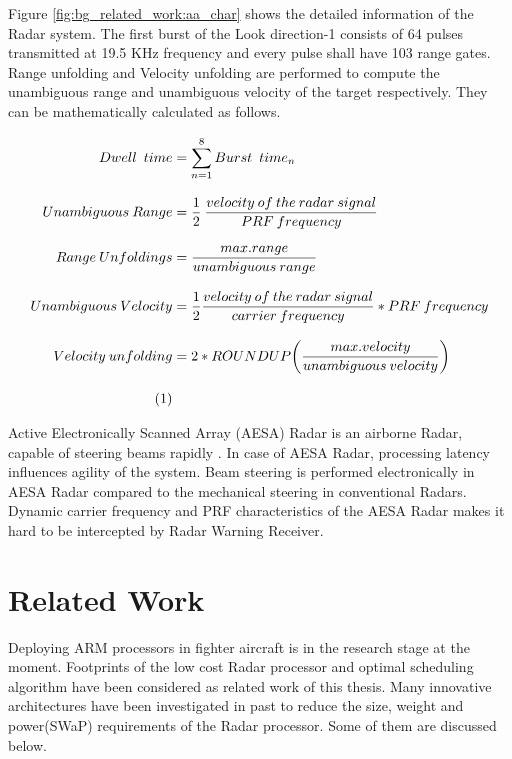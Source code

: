 Figure \ref{fig:bg_related_work:aa_char} shows the detailed information of the Radar system. The first burst of the Look direction-1 consists of 64 pulses transmitted at 19.5 KHz frequency and every pulse shall have 103 range gates. Range unfolding and Velocity unfolding are performed to compute the unambiguous range and unambiguous velocity of the target respectively. They can be mathematically calculated as follows. 

\begin{align*}
	\label{equ:burst_time_calc}
	Dwell \enspace time &= \sum\limits_{n=1}^{8} Burst \enspace time_{n} \\[0.3cm]
	Unambiguous \: Range &= \frac{1}{2} \: \frac{velocity \: of \: the \: radar \: signal}{PRF \: frequency} \\[0.3cm]
	Range \: Unfoldings &= \frac{max.range}{unambiguous \: range} \\[0.3cm]
	Unambiguous \: Velocity &= \frac{1}{2} \frac{velocity \: of \: the \: radar \: signal}{carrier \: frequency} * PRF \: frequency \\[0.3cm]
	Velocity \: unfolding &= 2 * ROUNDUP \bigg( \frac{max.velocity}{unambiguous \: velocity} \bigg ) \\[0.3cm] \stepcounter{equation}\tag{\theequation} 
\end{align*}

Active Electronically Scanned Array (AESA) Radar is an airborne Radar, capable of steering beams rapidly \cite{aesaAbt}. In case of AESA Radar, processing latency influences agility of the system. Beam steering is performed electronically in AESA Radar compared to the mechanical steering in conventional Radars. Dynamic carrier frequency and PRF characteristics of the AESA Radar makes it hard to be intercepted by Radar Warning Receiver.

\section{Related Work}
\label{sec:related_work}
Deploying ARM processors in fighter aircraft is in the research stage at the moment. Footprints of the low cost Radar processor and optimal scheduling algorithm have been considered as related work of this thesis. Many innovative architectures have been investigated in past to reduce the size, weight and power(SWaP) requirements of the Radar processor. Some of them are discussed below.


